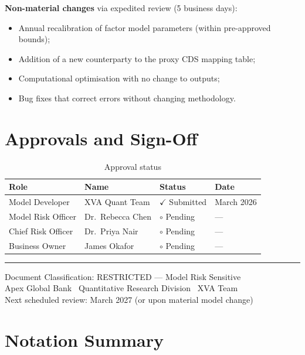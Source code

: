 \documentclass[11pt,a4paper]{article}
\begin{document}
\textbf{Non-material changes} via expedited review (5 business days):

\begin{itemize}[noitemsep]
  \item Annual recalibration of factor model parameters (within pre-approved bounds);
  \item Addition of a new counterparty to the proxy CDS mapping table;
  \item Computational optimisation with no change to outputs;
  \item Bug fixes that correct errors without changing methodology.
\end{itemize}

\section{Approvals and Sign-Off}

\begin{table}[h!]
\centering
\begin{tabular}{@{}llll@{}}
\toprule
\textbf{Role} & \textbf{Name} & \textbf{Status} & \textbf{Date} \\
\midrule
Model Developer      & XVA Quant Team      & $\checkmark$ Submitted & March 2026 \\
Model Risk Officer   & Dr.\ Rebecca Chen   & $\circ$ Pending & --- \\
Chief Risk Officer   & Dr.\ Priya Nair     & $\circ$ Pending & --- \\
Business Owner       & James Okafor        & $\circ$ Pending & --- \\
\bottomrule
\end{tabular}
\caption{Approval status}
\end{table}

\vspace{2em}
\hrule
\vspace{0.5em}
{\small\color{apexgray}
Document Classification: RESTRICTED --- Model Risk Sensitive\\
Apex Global Bank \textbar\ Quantitative Research Division \textbar\ XVA Team\\
Next scheduled review: March 2027 (or upon material model change)
}

\appendix
\section{Notation Summary}
\end{document}
